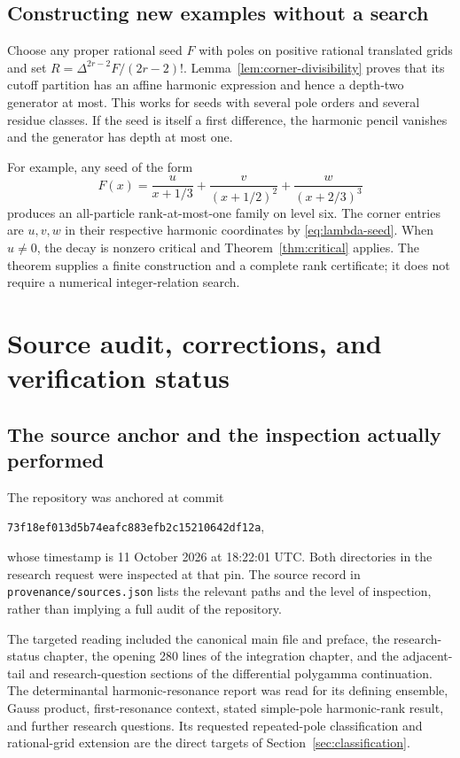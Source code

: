 \documentclass[11pt,letterpaper]{article}
\numberwithin{equation}{section}
\theoremstyle{definition}\newtheorem{definition}[theorem]{Definition}
\theoremstyle{remark}\newtheorem{remark}[theorem]{Remark}
\newcommand{\pin}{\texttt{73f18ef013d5b74eafc883efb2c15210642df12a}}
\begin{document}
\subsection{Constructing new examples without a search}
Choose any proper rational seed $F$ with poles on positive rational
translated grids and set $R=\Delta^{2r-2}F/(2r-2)!$.
Lemma~\ref{lem:corner-divisibility} proves that its cutoff partition has
an affine harmonic expression and hence a depth-two generator at most.
This works for seeds with several pole orders and several residue classes.
If the seed is itself a first difference, the harmonic pencil vanishes
and the generator has depth at most one.

For example, any seed of the form
\[
 F(x)=\frac{u}{x+1/3}+\frac{v}{(x+1/2)^2}
                         +\frac{w}{(x+2/3)^3}
\]
produces an all-particle rank-at-most-one family on level six. The corner
entries are $u,v,w$ in their respective harmonic coordinates by
\eqref{eq:lambda-seed}. When $u\ne0$, the decay is nonzero critical
and Theorem~\ref{thm:critical} applies. The theorem supplies a finite
construction and a complete rank certificate; it does not require a
numerical integer-relation search.

\section{Source audit, corrections, and verification status}
\label{sec:audit}

\subsection{The source anchor and the inspection actually performed}
The repository was anchored at commit
\begin{center}\pin,\end{center}
whose timestamp is 11 October 2026 at 18:22:01 UTC. Both directories in
the research request were inspected at that pin. The source record in
\texttt{provenance/sources.json} lists the relevant paths and the level of
inspection, rather than implying a full audit of the repository.

The targeted reading included the canonical main file and preface, the
research-status chapter, the opening 280 lines of the integration chapter,
and the adjacent-tail and research-question sections of the differential
polygamma continuation. The determinantal harmonic-resonance report was
read for its defining ensemble, Gauss product, first-resonance context,
stated simple-pole harmonic-rank result, and further research questions.
Its requested repeated-pole classification and rational-grid extension
are the direct targets of Section~\ref{sec:classification}.
\end{document}
